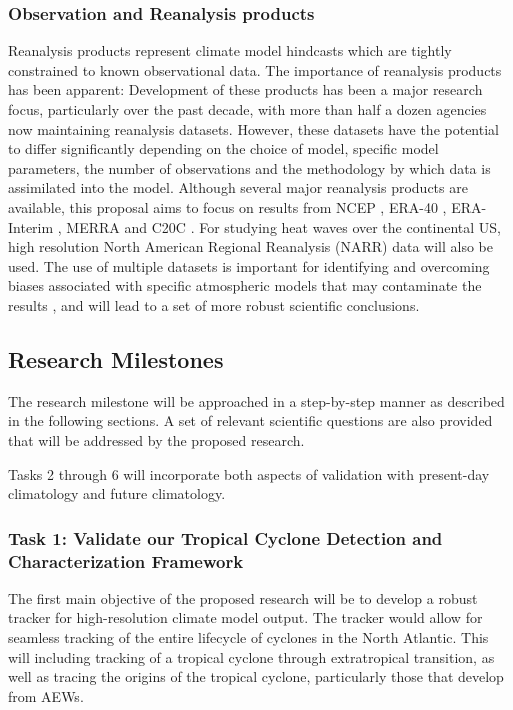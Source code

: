 \documentclass[11pt]{article}
\begin{document}
\subsubsection{Observation and Reanalysis products}

Reanalysis products represent climate model hindcasts which are tightly constrained to known observational data.  The importance of reanalysis products has been apparent:  Development of these products has been a major research focus, particularly over the past decade, with more than half a dozen agencies now maintaining reanalysis datasets.  However, these datasets have the potential to differ significantly depending on the choice of model, specific model parameters, the number of observations and the methodology by which data is assimilated into the model.  Although several major reanalysis products are available, this proposal aims to focus on results from NCEP \citep{kalnay1996ncep}, ERA-40 \citep{uppala2005era}, ERA-Interim \citep{simmons2007era}, MERRA \citep{rienecker2011merra} and C20C \citep{compo2011twentieth}.  For studying heat waves over the continental US, high resolution North American Regional Reanalysis (NARR) data will also be used.  The use of multiple datasets is important for identifying and overcoming biases associated with specific atmospheric models that may contaminate the results \citep{jun2008spatial}, and will lead to a set of more robust scientific conclusions.

\subsection{Research Milestones} \label{sec:ResearchMilestones}

The research milestone will be approached in a step-by-step manner as described in the following sections. A set of relevant scientific questions are also provided that will be addressed by the proposed research.

Tasks 2 through 6 will incorporate both aspects of validation with present-day climatology and future climatology.

\subsubsection{Task 1: Validate our Tropical Cyclone Detection and Characterization Framework}

The first main objective of the proposed research will be to develop a robust tracker for high-resolution climate model output. The tracker would allow for seamless tracking of the entire lifecycle of cyclones in the North Atlantic. This will including tracking of a tropical cyclone through extratropical transition, as well as tracing the origins of the tropical cyclone, particularly those that develop from AEWs. 
\end{document}
